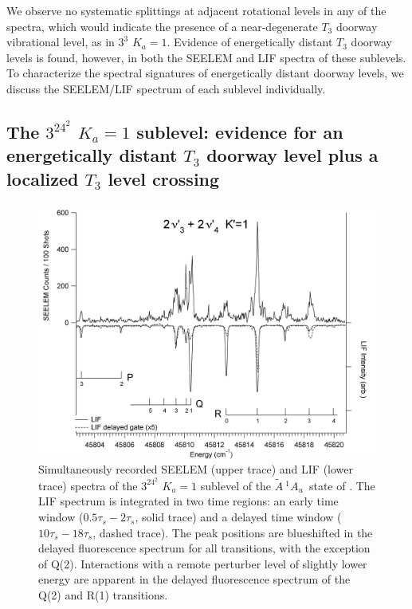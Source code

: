 \documentclass[12pt]{mitthesis}
\newcommand{\astate}{$
  \tilde{A} \: ^1\!A_u
  $}
\newcommand{\Ka}[1]{$K_a\!\!=\!#1$}
\begin{document}
We observe no systematic splittings at adjacent rotational levels in
any of the spectra, which would indicate the presence of a
near-degenerate $T_3$ doorway vibrational level, as in $3^3$ \Ka{1}.
Evidence of energetically distant $T_3$ doorway levels is found,
however, in both the SEELEM and LIF spectra of these sublevels.  To
characterize the spectral signatures of energetically distant doorway
levels, we discuss the SEELEM/LIF spectrum of each sublevel
individually.


\subsection{The $3^24^2$ \Ka{1} sublevel: evidence for an
  energetically distant $T_3$ doorway level plus a localized $T_3$
  level crossing}




\begin{figure}
  \caption{Simultaneously recorded SEELEM (upper trace) and LIF (lower
    trace) spectra of the $3^24^2$ \Ka{1} sublevel of the \astate\
    state of .  The LIF spectrum is integrated in two time
    regions: an early time window ($0.5\tau_s-2\tau_s$, solid trace)
    and a delayed time window ($10\tau_s-18\tau_s$, dashed trace).
    The peak positions are blueshifted in the delayed fluorescence
    spectrum for all transitions, with the exception of Q(2).
    Interactions with a remote perturber level of slightly lower
    energy are apparent in the delayed fluorescence spectrum of the
    Q(2) and R(1) transitions.}
  \label{fig:spectrum-32b2}
  \centering
  \includegraphics[width=7in,angle=90]{acetylene-32b2-p3r4.png}
\end{figure}
\end{document}
